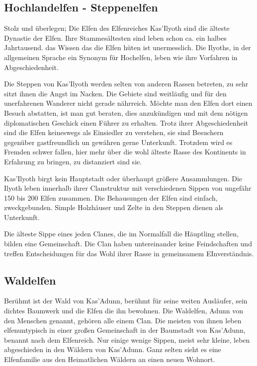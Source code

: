\subsection{Hochlandelfen - Steppenelfen}
\par Stolz und überlegen; Die Elfen des Elfenreiches Kas'Ilyoth sind
die älteste Dynastie der Elfen. Ihre Stammesältesten sind leben
schon ca. ein halbes Jahrtausend. das Wissen das die Elfen hüten ist
unermesslich. Die Ilyoths, in der allgemeinen Sprache ein Synonym
für Hochelfen, leben wie ihre Vorfahren in Abgeschiedenheit.
\par Die Steppen von Kas'Ilyoth werden selten von anderen Rassen betreten, zu
sehr sitzt ihnen die Angst im Nacken. Die Gebiete sind weitläufig
und für den unerfahrenen Wanderer nicht gerade nährreich. Möchte man
den Elfen dort einen Besuch abstatten, ist man gut beraten, dies
anzukündigen und mit dem nötigen diplomatischen Geschick einen
Führer zu erhalten. Trotz ihrer Abgeschiedenheit sind die Elfen
keineswegs als Einsiedler zu verstehen, sie sind Besuchern gegenüber
gastfreundlich un gewähren gerne Unterkunft. Trotzdem wird es
Fremden schwer fallen, hier mehr über die wohl älteste Rasse des
Kontinents in Erfahrung zu bringen, zu distanziert sind sie.
\par Kas'Ilyoth birgt kein Hauptstadt oder überhaupt größere
Ansammlungen. Die Ilyoth leben innerhalb ihrer Clanstruktur mit
verschiedenen Sippen von ungefähr 150 bis 200 Elfen zusammen. Die
Behausungen der Elfen sind einfach, zweckgebunden. Simple Holzhäuser
und Zelte in den Steppen dienen als Unterkunft.
\par Die älteste Sippe eines jeden Clanes, die im Normalfall die Häuptling stellen,
bilden eine Gemeinschaft. Die Clan haben untereinander keine
Feindschaften und treffen Entscheidungen für das Wohl ihrer Rasse in
gemeinsamem EInverständnis.

\subsection{Waldelfen}
\par Berühmt ist der Wald von Kas'Adunn, berühmt für seine weiten
Ausläufer, sein dichtes Baumwerk und die Elfen die ihn bewohnen. Die
Waldelfen, Adunn von den Menschen genannt, gehören alle einem Clan.
Die meisten von ihnen leben elfenuntypisch in einer großen
Gemeinschaft in der Baumstadt von Kas'Adunn, benannt nach dem
Elfenreich. Nur einige wenige Sippen, meist sehr kleine, leben
abgeschieden in den Wäldern von Kas'Adunn. Ganz selten sieht es eine
Elfenfamilie aus den Heimatlichen Wäldern an einen neuen Wohnort.

